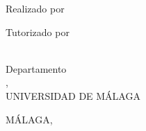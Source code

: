 \vspace*{-10mm}
\hspace*{-10mm}

\begin{minipage}{0.6\textwidth}
    \begin{center}
        \MakeUppercase{\facultad}
        \bigbreak
        
        \grado
        \bigbreak
        
        \tituloes
        \bigbreak
        \tituloen
        \bigbreak
        
        Realizado por \\
        \alumno
        \bigbreak
        
        Tutorizado por \\
        \tutor \\
        
        \bigbreak
        
        Departamento \\
        \departamento,\\
        UNIVERSIDAD DE MÁLAGA
        \bigbreak
        
        MÁLAGA, \MakeUppercase{\fecha}
    \end{center}
\end{minipage}
